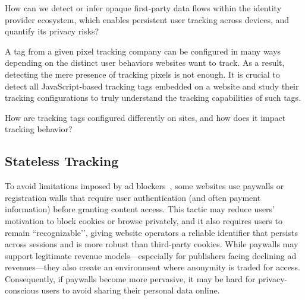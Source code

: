 \begin{opbox}
How can we detect or infer opaque first-party data flows within the identity provider ecosystem, which enables persistent user tracking across devices, and quantify its privacy risks?
\end{opbox}

A tag from a given pixel tracking company can be configured in many ways depending on the distinct user behaviors websites want to track. As a result, detecting the mere presence of tracking pixels is not enough.
%
It is crucial to detect all JavaScript-based tracking tags embedded on a website and study their tracking configurations to truly understand the tracking capabilities of such tags.
\begin{opbox}
How are tracking tags configured differently on sites, and how does it impact tracking behavior?
\end{opbox}



\subsection{Stateless Tracking}

To avoid limitations imposed by ad blockers~\cite{koreacopyrightcommissionNumberAdblockUsers2024}, some websites use paywalls or registration walls that require user authentication (and often payment information) before granting content access.
%
This tactic may reduce users' motivation to block cookies or browse privately, and it also requires users to remain ``recognizable’’, giving website operators a reliable identifier that persists across sessions and is more robust than third-party cookies.
%
While paywalls may support legitimate revenue models---especially for publishers facing declining ad revenues---they also create an environment where anonymity is traded for access.
%
Consequently, if paywalls become more pervasive, it may be hard for privacy-conscious users to avoid sharing their personal data online.

